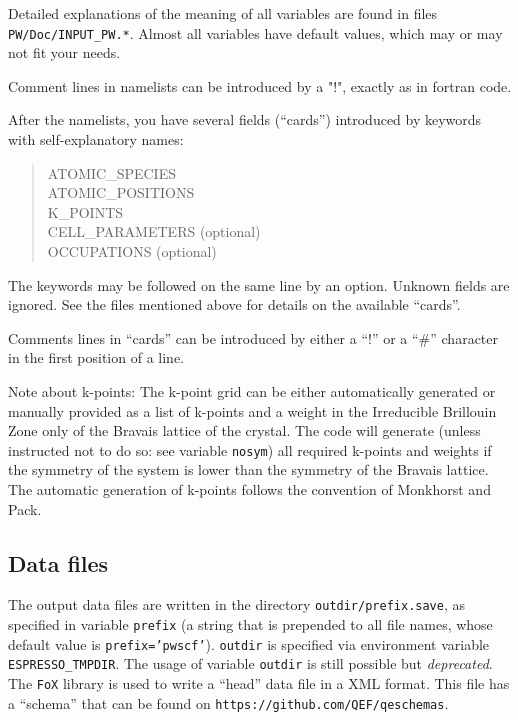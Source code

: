\documentclass[12pt,a4paper]{article}
\begin{document}
Detailed explanations of the meaning of all variables are found in files
\texttt{PW/Doc/INPUT\_PW.*}. Almost all variables have default 
values, which may or may not fit your needs.

Comment lines in namelists can be introduced by a "!", exactly as in fortran 
code. 
    
After the namelists, you have several fields (``cards'')
introduced by keywords with self-explanatory names:
\begin{quote}
       ATOMIC\_SPECIES\\
       ATOMIC\_POSITIONS\\
       K\_POINTS\\
       CELL\_PARAMETERS (optional)\\
       OCCUPATIONS (optional)\\
\end{quote}
The keywords may be followed on the same line by an option. Unknown
fields are ignored. 
See the files mentioned above for details on the available ``cards''.

Comments lines in ``cards'' can be introduced by either a ``!'' or a ``\#''
character in the first position of a line.
 
Note about k-points: The k-point grid can be either automatically generated 
or manually provided as a list of k-points and a weight in the Irreducible
Brillouin Zone only of the Bravais lattice of the crystal. The code will 
generate (unless instructed not to do so: see variable \texttt{nosym}) all
required k-points
and weights if the symmetry of the system is lower than the symmetry of the
Bravais lattice. The automatic generation of k-points follows the convention
of Monkhorst and Pack.

\subsection{Data files}

The output data files are written in the directory \texttt{outdir/prefix.save},
as specified in variable \texttt{prefix} (a string that is prepended
to all file names, whose default value is \texttt{prefix='pwscf'}).
\texttt{outdir} is specified via environment variable
\texttt{ESPRESSO\_TMPDIR}. The usage of variable \texttt{outdir} is
still possible but {\em deprecated}. The \texttt{FoX} library is used
to write a ``head'' data file in a XML format. This file has a ``schema''
that can be found on \texttt{https://github.com/QEF/qeschemas}.
\end{document}
